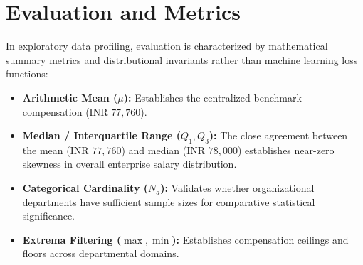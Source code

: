 \section{Evaluation and Metrics}
In exploratory data profiling, evaluation is characterized by mathematical summary metrics and distributional invariants rather than machine learning loss functions:
\begin{itemize}
    \item \textbf{Arithmetic Mean ($\mu$):} Establishes the centralized benchmark compensation ($\text{INR } 77,760$).
    \item \textbf{Median / Interquartile Range ($Q_1, Q_3$):} The close agreement between the mean ($\text{INR } 77,760$) and median ($\text{INR } 78,000$) establishes near-zero skewness in overall enterprise salary distribution.
    \item \textbf{Categorical Cardinality ($N_d$):} Validates whether organizational departments have sufficient sample sizes for comparative statistical significance.
    \item \textbf{Extrema Filtering ($\max, \min$):} Establishes compensation ceilings and floors across departmental domains.
\end{itemize}

